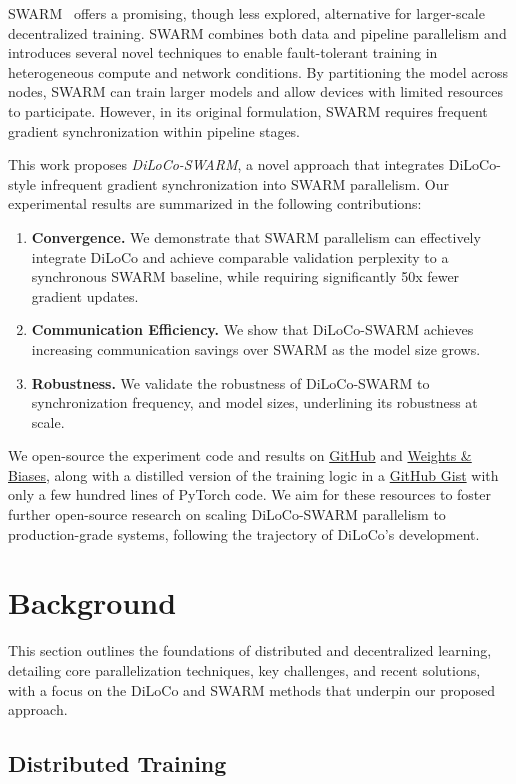 \documentclass{article}
\newcommand{\github}{\href{https://github.com/mikasenghaas/diloco-swarm}{GitHub}}
\newcommand{\wandb}{\href{https://wandb.ai/mikasenghaas/diloco-swarm}{Weights \& Biases}}
\newcommand{\gist}{\href{https://gist.github.com/mikasenghaas/5fa1aa77ea69f187f531a5889983c249}{GitHub Gist}}
\begin{document}
SWARM~\cite{ryabinin2023swarm} offers a promising, though less explored, alternative for larger-scale decentralized training. SWARM combines both data and pipeline parallelism and introduces several novel techniques to enable fault-tolerant training in heterogeneous compute and network conditions. By partitioning the model across nodes, SWARM can train larger models and allow devices with limited resources to participate. However, in its original formulation, SWARM requires frequent gradient synchronization within pipeline stages. 

This work proposes \textit{DiLoCo-SWARM}, a novel approach that integrates DiLoCo-style infrequent gradient synchronization into SWARM parallelism. Our experimental results are summarized in the following contributions:

\begin{enumerate}
  \item \textbf{Convergence.} We demonstrate that SWARM parallelism can effectively integrate DiLoCo and achieve comparable validation perplexity to a synchronous SWARM baseline, while requiring significantly 50x fewer gradient updates.
  \item \textbf{Communication Efficiency.} We show that DiLoCo-SWARM achieves increasing communication savings over SWARM as the model size grows.
  \item \textbf{Robustness.} We validate the robustness of DiLoCo-SWARM to synchronization frequency, and model sizes, underlining its robustness at scale.
\end{enumerate}

We open-source the experiment code and results on \github{} and \wandb{}, along with a distilled version of the training logic in a \gist{} with only a few hundred lines of PyTorch code. We aim for these resources to foster further open-source research on scaling DiLoCo-SWARM parallelism to production-grade systems, following the trajectory of DiLoCo's development.

\section{Background}

This section outlines the foundations of distributed and decentralized learning, detailing core parallelization techniques, key challenges, and recent solutions, with a focus on the DiLoCo and SWARM methods that underpin our proposed approach.

\subsection{Distributed Training}
\end{document}

